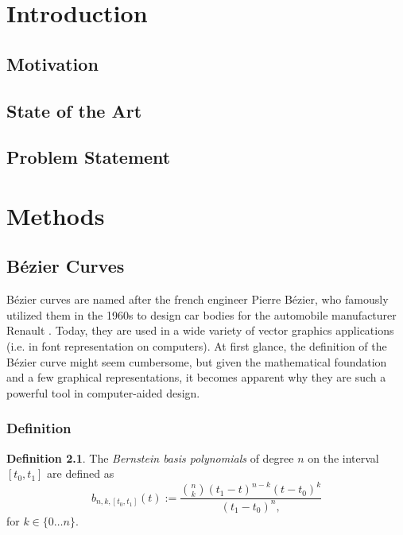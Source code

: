 \documentclass[a4paper, 11pt]{report}
\theoremstyle{definition}
\newtheorem{definition}{Definition}[section]
\renewcommand{\emph}[1]{\textit{#1}}
\begin{document}
\restoregeometry
\begin{abstract}
	\thispagestyle{plain}
	\setcounter{page}{3}
	\lipsum[1-3]
\end{abstract}
\renewcommand{\abstractname}{Zusammenfassung}
\begin{abstract}
	\thispagestyle{plain}
	\setcounter{page}{4}
	\lipsum[4-6]
\end{abstract}
\pagebreak

\setcounter{page}{5}
\restoregeometry
\tableofcontents
\pagebreak

\restoregeometry
{}
\setcounter{page}{1}
\pagestyle{plain}

\chapter{Introduction}
\section{Motivation}
\section{State of the Art}
\section{Problem Statement}

\chapter{Methods}
\section{Bézier Curves}
Bézier curves are named after the french engineer Pierre Bézier, who famously utilized them in the 1960s to design car bodies for the automobile manufacturer Renault \cite{Bezier1968}. Today, they are used in a wide variety of vector graphics applications (i.e. in font representation on computers). At first glance, the definition of the Bézier curve might seem cumbersome, but given the mathematical foundation and a few graphical representations, it becomes apparent why they are such a powerful tool in computer-aided design.

\subsection{Definition}
\begin{definition}
	The \emph{Bernstein basis polynomials} of degree $n$ on the interval $[t_0,t_1]$ are defined as
	\begin{equation}\label{bernsteinbasisdef}
		b_{n,k,[t_0, t_1]}(t) := \frac{\binom{n}{k} (t_1-t)^{n-k}(t-t_0)^k}{(t_1-t_0)^n,}
	\end{equation}
	for $k \in \{0\dots n\}$.
\end{definition}
\end{document}

